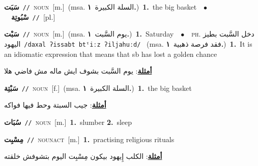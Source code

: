 \documentclass[10pt,a4paper,twoside]{article} %
\begin{document}
\begin{multicols}{2}
{\setlength\topsep{0pt}\textbf{\foreignlanguage{arabic}{سَبَت}}\ {\color{gray}\texttt{//}\color{black}}\ \textsc{noun}\ [m.]\ \color{gray}(msa. \foreignlanguage{arabic}{السلة الكبيرة}~\foreignlanguage{arabic}{\textbf{١.}})\color{black}\ \textbf{1.}~the big basket\ \ $\bullet$\ \ \setlength\topsep{0pt}\textbf{\foreignlanguage{arabic}{سْبُوتِة}}\ {\color{gray}\texttt{//}\color{black}}\ [pl.]\ } \vspace{2mm}

{\setlength\topsep{0pt}\textbf{\foreignlanguage{arabic}{سَبْت}}\ {\color{gray}\texttt{//}\color{black}}\ \textsc{noun}\ [m.]\ \color{gray}(msa. \foreignlanguage{arabic}{يوم السَّبت}~\foreignlanguage{arabic}{\textbf{١.}})\color{black}\ \textbf{1.}~Saturday\ \ $\bullet$\ \ \textsc{ph.} \color{gray} \foreignlanguage{arabic}{دخل السَّبت بطيز اليهود}\color{black}\ {\color{gray}\texttt{/{\sffamily daxal ʔissabt btˤiːz ʔiljahuːd}/}\color{black}}\ \color{gray} (msa. \foreignlanguage{arabic}{فقد فرصة ذهبية}~\foreignlanguage{arabic}{\textbf{١.}})\color{black}\ \textbf{1.}~It is an idiomatic expression that means that sb has lost a golden chance\  \begin{flushright}\color{gray}\foreignlanguage{arabic}{\textbf{\underline{\foreignlanguage{arabic}{أمثلة}}}: يوم السَّبت بشوف ايش ماله مش فاضي هلا}\end{flushright}\color{black}} \vspace{2mm}

{\setlength\topsep{0pt}\textbf{\foreignlanguage{arabic}{سَبْتِة}}\ {\color{gray}\texttt{//}\color{black}}\ \textsc{noun}\ [f.]\ \color{gray}(msa. \foreignlanguage{arabic}{السلة الكبيرة}~\foreignlanguage{arabic}{\textbf{١.}})\color{black}\ \textbf{1.}~the big basket\  \begin{flushright}\color{gray}\foreignlanguage{arabic}{\textbf{\underline{\foreignlanguage{arabic}{أمثلة}}}: جيب السبتة وحط فيها فواكه}\end{flushright}\color{black}} \vspace{2mm}

{\setlength\topsep{0pt}\textbf{\foreignlanguage{arabic}{سُبَات}}\ {\color{gray}\texttt{//}\color{black}}\ \textsc{noun}\ [m.]\ \textbf{1.}~slumber  \textbf{2.}~sleep\ } \vspace{2mm}

{\setlength\topsep{0pt}\textbf{\foreignlanguage{arabic}{مِسْبِت}}\ {\color{gray}\texttt{//}\color{black}}\ \textsc{noun\textunderscore act}\ [m.]\ \textbf{1.}~practising religious rituals\  \begin{flushright}\color{gray}\foreignlanguage{arabic}{\textbf{\underline{\foreignlanguage{arabic}{أمثلة}}}: الكلب إِيهود بيكون مِسْبِت اليوم بتشوفش خلقته}\end{flushright}\color{black}} \vspace{2mm}


\end{multicols}
\end{document}
